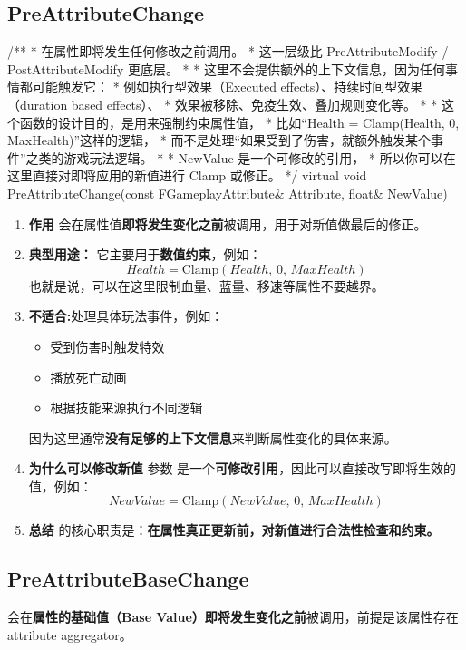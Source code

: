 \subsection{PreAttributeChange}
\begin{code}[caption={声明及注释}]
	/**
	* 在属性即将发生任何修改之前调用。
	* 这一层级比 PreAttributeModify / PostAttributeModify 更底层。
	*
	* 这里不会提供额外的上下文信息，因为任何事情都可能触发它：
	* 例如执行型效果（Executed effects）、持续时间型效果（duration based effects）、
	* 效果被移除、免疫生效、叠加规则变化等。
	*
	* 这个函数的设计目的，是用来强制约束属性值，
	* 比如“Health = Clamp(Health, 0, MaxHealth)”这样的逻辑，
	* 而不是处理“如果受到了伤害，就额外触发某个事件”之类的游戏玩法逻辑。
	*
	* NewValue 是一个可修改的引用，
	* 所以你可以在这里直接对即将应用的新值进行 Clamp 或修正。
	*/
	virtual void PreAttributeChange(const FGameplayAttribute& Attribute, float& NewValue) { }	
\end{code}
\begin{enumerate}
	\item \textbf{作用}
	 会在属性值\textbf{即将发生变化之前}被调用，用于对新值做最后的修正。
	
	\item \textbf{典型用途：} 它主要用于\textbf{数值约束}，例如：
	\[
	Health = \mathrm{Clamp}(Health,\, 0,\, MaxHealth)
	\]
	也就是说，可以在这里限制血量、蓝量、移速等属性不要越界。
	
	\item \textbf{不适合:}处理具体玩法事件，例如：
	\begin{itemize}
		\item 受到伤害时触发特效
		\item 播放死亡动画
		\item 根据技能来源执行不同逻辑
	\end{itemize}
	因为这里通常\textbf{没有足够的上下文信息}来判断属性变化的具体来源。
	
	\item \textbf{为什么可以修改新值}
	参数  是一个\textbf{可修改引用}，因此可以直接改写即将生效的值，例如：
	\[
	NewValue = \mathrm{Clamp}(NewValue,\, 0,\, MaxHealth)
	\]
	
	\item \textbf{总结}
	 的核心职责是：\textbf{在属性真正更新前，对新值进行合法性检查和约束。}
\end{enumerate}
\subsection{PreAttributeBaseChange}
 会在\textbf{属性的基础值（Base Value）即将发生变化之前}被调用，前提是该属性存在 attribute aggregator。

